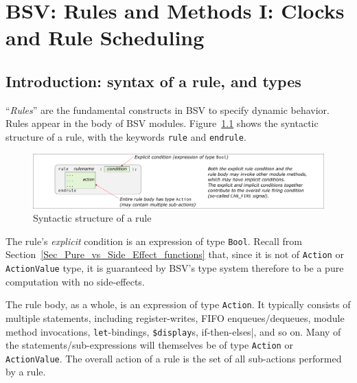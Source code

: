 

\chapter{BSV: Rules and Methods I: Clocks and Rule Scheduling}


\setcounter{page}{1}
\renewcommand{\thepage}{\arabic{chapter}-\arabic{page}}

\label{ch_Rules_I}


\section{Introduction: syntax of a rule, and types}


``\emph{Rules}'' are the fundamental constructs in BSV to specify
dynamic behavior.  Rules appear in the body of BSV modules.
Figure~\ref{Fig_Rule_Structure} shows the syntactic structure of a
rule, with the keywords \verb|rule| and \verb|endrule|.
\begin{figure}[htbp]
  \centerline{\includegraphics[width=6in,angle=0]{Figures/Fig_Rule_Structure}}
  \caption{\label{Fig_Rule_Structure} Syntactic structure of a rule}
\end{figure}


The rule's \emph{explicit} condition is an expression of type
\verb|Bool|.  Recall from
Section~\ref{Sec_Pure_vs_Side_Effect_functions} that, since it is not
of \verb|Action| or \verb|ActionValue| type, it is guaranteed by BSV's
type system therefore to be a pure computation with no side-effects.


The rule body, as a whole, is an expression of type \verb|Action|.  It
typically consists of multiple statements, including register-writes,
FIFO enqueues/dequeues, module method invocations,
\verb|let|-bindings, \verb|$display|s, if-then-elses|, and so on.
Many of the statements/sub-expressions will themselves be of type
\verb|Action| or \verb|ActionValue|.  The overall action of a rule is
the set of all sub-actions performed by a rule.

